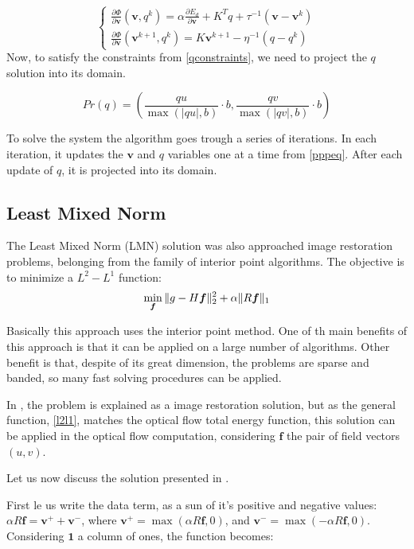\documentclass[12pt,a4paper,twoside]{report}
\begin{document}
{$$ \label{pppeq}
\left\{
\begin{array}{ll}
\frac{\partial \Phi}{\partial \boldsymbol{v}}(\boldsymbol{v}, q^k)  = \alpha \frac{\partial E_d}{\partial\boldsymbol{v}}+ K^Tq + \tau^{-1}(\boldsymbol{v}- \boldsymbol{v}^{k}) \\
\frac{\partial \Phi}{\partial \boldsymbol{v}}(\boldsymbol{v}^{k+1}, q^k)  = K\boldsymbol{v}^{k+1} - \eta^{-1}(q - q^k)
\end{array}
\right.
$$
Now, to satisfy the constraints from \ref{qconstraints}, we need to project the $q$ solution into its domain.

$$ \label{projction}
Pr(q) = (\frac{qu}{\max(|qu|, b)}\cdot b ,\frac{qv}{\max(|qv|, b)}\cdot b  )
$$ 

To solve the system the algorithm goes trough a series of iterations. In each iteration, it updates the $\boldsymbol{v}$ and $q$ variables one at a time from \ref{pppeq}. After each update of $q$, it is projected into its domain.  

\subsection{Least Mixed Norm} \label{lmn}
The Least Mixed Norm (LMN) solution was also approached image restoration problems, belonging from the family of interior point algorithms. The objective is to minimize a $L^2-L^1$ function:
\begin{equation} \label{l2l1}
	\min_{\boldsymbol{f}}\Arrowvert g - H\boldsymbol{f}\Arrowvert_2^2+ \alpha\Arrowvert R \boldsymbol{f}\Arrowvert_1
\end{equation}

Basically this approach uses the interior point method. One of th main benefits of this approach is that it can be applied on a large number of algorithms. Other benefit is that, despite of its great dimension, the problems are sparse and banded, so many fast solving procedures can be applied.

In \cite{fu2006efficient}, the problem is explained as a image restoration solution, but as the general function, \ref{l2l1}, matches the optical flow total energy function, this solution can be applied in the optical flow computation, considering $\boldsymbol{f}$ the pair of field vectors $(u,v)$.

Let us now discuss the solution presented in \cite{fu2006efficient}.

First le us write the data term, as a sun of it's positive and negative values:  $\alpha R \boldsymbol{f} = \boldsymbol{v}^+ + \boldsymbol{v}^-$, where $\boldsymbol{v}^+ = \max(\alpha R \boldsymbol{f}, 0) $, and  $\boldsymbol{v}^- = \max(-\alpha R \boldsymbol{f}, 0) $. Considering $\boldsymbol{1}$ a column of ones, the function becomes:

}
\end{document}
